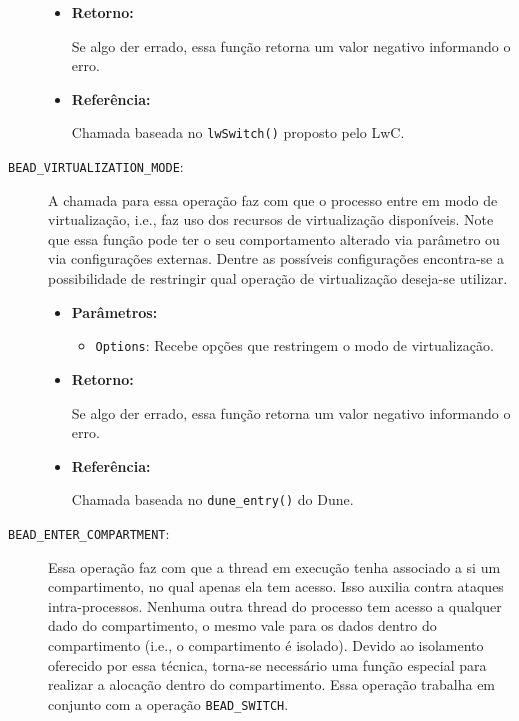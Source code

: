 \begin{description}
\begin{itemize}
    \item \textbf{Retorno:}

Se algo der errado, essa função retorna um valor negativo informando o erro.

    \item \textbf{Referência:}

Chamada baseada no \texttt{lwSwitch()} proposto pelo LwC.

  \end{itemize}

  \item [\texttt{BEAD\_VIRTUALIZATION\_MODE}:]

A chamada para essa operação faz com que o processo entre em modo de
virtualização, i.e., faz uso dos recursos de virtualização disponíveis. Note
que essa função pode ter o seu comportamento alterado via parâmetro ou via
configurações externas. Dentre as possíveis configurações encontra-se a
possibilidade de restringir qual operação de virtualização deseja-se utilizar.

  \begin{itemize}
    \item \textbf{Parâmetros:}

    \begin{itemize}
      \item \texttt{Options}: Recebe opções que restringem o modo de virtualização.
    \end{itemize}

    \item \textbf{Retorno:}

Se algo der errado, essa função retorna um valor negativo informando o erro.

    \item \textbf{Referência:}

Chamada baseada no \texttt{dune\_entry()} do Dune.

  \end{itemize}

	\item [\texttt{BEAD\_ENTER\_COMPARTMENT}:]

Essa operação faz com que a thread em execução tenha associado a si um
compartimento, no qual apenas ela tem acesso. Isso auxilia contra
ataques intra-processos. Nenhuma outra thread do processo tem acesso a qualquer
dado do compartimento, o mesmo vale para os dados dentro do compartimento
(i.e., o compartimento é isolado). Devido ao isolamento oferecido por essa
técnica, torna-se necessário uma função especial para realizar a alocação
dentro do compartimento. Essa operação trabalha em conjunto com a operação
\texttt{BEAD\_SWITCH}.


\end{description}
